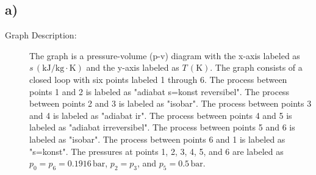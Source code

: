 

\subsection*{a)}

\begin{description}
    \item[Graph Description:] The graph is a pressure-volume (p-v) diagram with the x-axis labeled as $s \, (\text{kJ}/\text{kg} \cdot \text{K})$ and the y-axis labeled as $T \, (\text{K})$. The graph consists of a closed loop with six points labeled 1 through 6. The process between points 1 and 2 is labeled as "adiabat s=konst reversibel". The process between points 2 and 3 is labeled as "isobar". The process between points 3 and 4 is labeled as "adiabat ir". The process between points 4 and 5 is labeled as "adiabat irreversibel". The process between points 5 and 6 is labeled as "isobar". The process between points 6 and 1 is labeled as "s=konst". The pressures at points 1, 2, 3, 4, 5, and 6 are labeled as $p_0 = p_6 = 0.1916 \, \text{bar}$, $p_2 = p_3$, and $p_5 = 0.5 \, \text{bar}$.
\end{description}